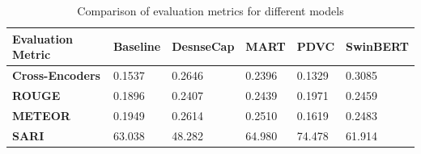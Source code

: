 \begin{table}[!h]
    \centering
    \renewcommand{\arraystretch}{1.2}
        \begin{tabular}{|p{2.8cm}p{2.3cm}p{2.3cm}p{2.3cm}p{2.3cm}p{2.3cm}|} 
             \hline
             \textbf{Evaluation Metric} & \textbf{Baseline} & \textbf{DesnseCap} & \textbf{MART} & \textbf{PDVC} & \textbf{SwinBERT} \\ 
             \hline\hline
             \textbf{Cross-Encoders} & 0.1537 &  0.2646 & 0.2396 & 0.1329 & 0.3085 \\ 
             \textbf{ROUGE} & 0.1896 & 0.2407 & 0.2439 & 0.1971 & 0.2459\\
             \textbf{METEOR} & 0.1949 & 0.2614 & 0.2510 & 0.1619 & 0.2483\\
             \textbf{SARI} & 63.038 & 48.282 & 64.980 & 74.478 & 61.914 \\
             \hline     
        \end{tabular}
    \caption{Comparison of evaluation metrics for different models}
    \label{tab:table3}
\end{table}

